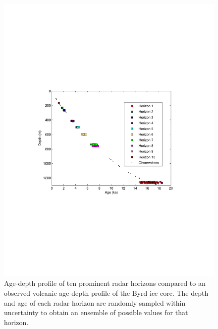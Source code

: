 \documentclass[12pt]{article}
\begin{document}
\begin{figure}[ht]
\begin{center}
\includegraphics[scale=0.75]{figures/hor_agedepth_morland}
\captionsetup{width=.9\textwidth}
\caption{ Age-depth profile of ten prominent radar horizons compared to an observed volcanic age-depth profile of the Byrd ice core. The depth and age of each radar horizon are randomly sampled within uncertainty to obtain an ensemble of possible values for that horizon.  }
\label{fig:horagedepth}
\end{center}
\end{figure}
\end{document}
